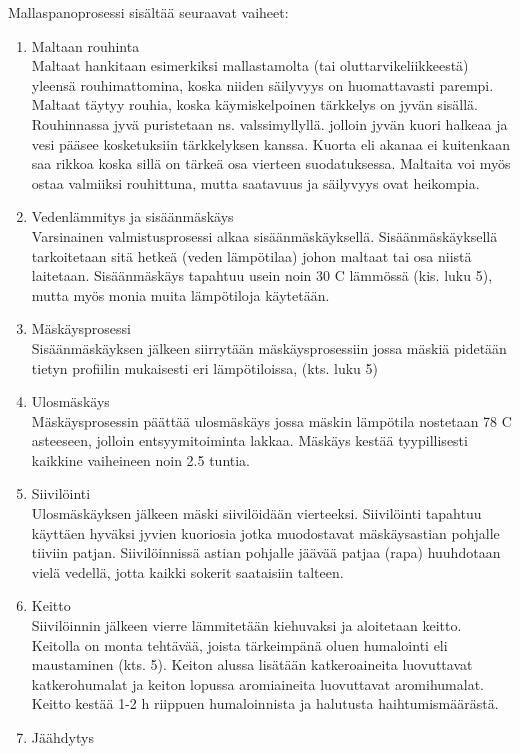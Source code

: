 \documentclass[a4paper,11pt]{report}
\begin{document}
Mallaspanoprosessi sisältää seuraavat vaiheet:
\begin{enumerate}
\item Maltaan rouhinta \hfill \\
Maltaat hankitaan esimerkiksi mallastamolta (tai oluttarvikeliikkeestä) yleensä rouhimattomina, koska niiden säilyvyys on huomattavasti parempi. Maltaat täytyy rouhia, koska käymiskelpoinen tärkkelys on jyvän sisällä. Rouhinnassa jyvä puristetaan ns. valssimyllyllä. jolloin jyvän kuori halkeaa ja vesi pääsee kosketuksiin tärkkelyksen kanssa. Kuorta eli akanaa ei kuitenkaan saa rikkoa koska sillä on tärkeä osa vierteen suodatuksessa. Maltaita voi myös ostaa valmiiksi rouhittuna, mutta saatavuus ja säilyvyys ovat heikompia.
\item Vedenlämmitys ja sisäänmäskäys \hfill \\
Varsinainen valmistusprosessi alkaa sisäänmäskäyksellä. Sisäänmäskäyksellä tarkoitetaan sitä hetkeä (veden lämpötilaa) johon maltaat tai osa niistä laitetaan. Sisäänmäskäys tapahtuu usein noin 30 \degree C lämmössä (kis. luku 5), mutta myös monia muita lämpötiloja käytetään.
\item Mäskäysprosessi \hfill \\
Sisäänmäskäyksen jälkeen siirrytään mäskäysprosessiin jossa mäskiä pidetään tietyn profiilin mukaisesti eri lämpötiloissa, (kts. luku 5)
\item	Ulosmäskäys \hfill \\
Mäskäysprosessin päättää ulosmäskäys jossa mäskin lämpötila nostetaan 78 \degree C asteeseen, jolloin entsyymitoiminta lakkaa. Mäskäys kestää tyypillisesti kaikkine vaiheineen noin 2.5 tuntia.
\item	Siivilöinti \hfill \\
Ulosmäskäyksen jälkeen mäski siivilöidään vierteeksi. Siivilöinti tapahtuu käyttäen hyväksi jyvien kuoriosia jotka muodostavat mäskäysastian pohjalle tiiviin patjan. Siivilöinnissä astian pohjalle jäävää patjaa (rapa) huuhdotaan vielä vedellä, jotta kaikki sokerit saataisiin talteen.
\item Keitto \hfill \\
Siivilöinnin jälkeen vierre lämmitetään kiehuvaksi ja aloitetaan keitto. Keitolla on monta tehtävää, joista tärkeimpänä oluen humalointi eli maustaminen (kts. 5). Keiton alussa lisätään katkeroaineita luovuttavat katkerohumalat ja keiton lopussa aromiaineita luovuttavat aromihumalat. Keitto kestää 1-2 h riippuen humaloinnista ja halutusta haihtumismäärästä.
\item Jäähdytys \hfill \\

\end{enumerate}
\end{document}
